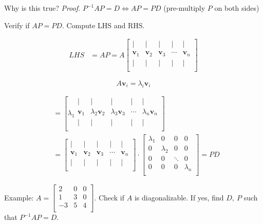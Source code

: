\documentclass[
]{article}
\begin{document}
Why is this true? \emph{Proof.}
$P^{- 1}AP = D \Leftrightarrow AP = PD$ (pre-multiply $P$ on both
sides)

Verify if $AP = PD$. Compute LHS and RHS.

\begin{align*}
LHS &= AP = A\begin{bmatrix}
 \mid & \mid & \mid & \mid & \mid \\
{\mathbf{v}}_{1} & {\mathbf{v}}_{2} & {\mathbf{v}}_{3} & \cdots & {\mathbf{v}}_{n} \\
 \mid & \mid & \mid & \mid & \mid \\
\end{bmatrix}
\end{align*}


$$A{\mathbf{v}}_{i} = \lambda_{i}{\mathbf{v}}_{i}$$

\begin{align*}
&= \left\lbrack \lambda_{1}\begin{matrix}
 \mid & \mid & \mid & \mid & \mid \\
{\mathbf{v}}_{1} & \lambda_{2}{\mathbf{v}}_{2} & \lambda_{3}{\mathbf{v}}_{3} & \cdots & \lambda_{n}{\mathbf{v}}_{n} \\
 \mid & \mid & \mid & \mid & \mid \\
\end{matrix} \right\rbrack  \\
&= \begin{bmatrix}
 \mid & \mid & \mid & \mid & \mid \\
{\mathbf{v}}_{1} & {\mathbf{v}}_{2} & {\mathbf{v}}_{3} & \cdots & {\mathbf{v}}_{n} \\
 \mid & \mid & \mid & \mid & \mid \\
\end{bmatrix} \cdot \begin{bmatrix}
\lambda_{1} & 0 & 0 & 0 \\
0 & \lambda_{2} & 0 & 0 \\
0 & 0 & \ddots & 0 \\
0 & 0 & 0 & \lambda_{n} \\
\end{bmatrix} = PD
\end{align*}


Example: $A = \begin{bmatrix}
2 & 0 & 0 \\
1 & 3 & 0 \\
 - 3 & 5 & 4 \\
\end{bmatrix}$. Check if $A$ is diagonalizable. If yes, find
$D,\ P$ such that $P^{- 1}AP = D$.
\end{document}
